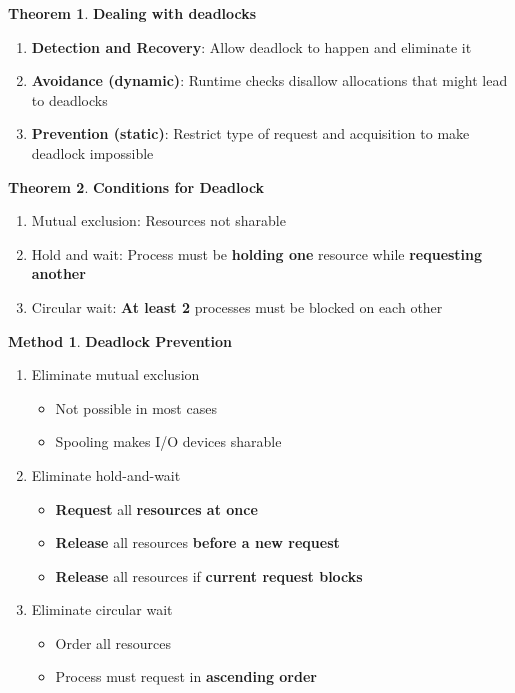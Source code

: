 \documentclass[12pt,a4paper]{article}
\theoremstyle{definition}
\newtheorem{theorem}{Theorem}[section]
\newtheorem{method}{Method}[section]
\newenvironment{myitemize}
{ \begin{itemize}
    \setlength{\itemsep}{5pt}
    \setlength{\parskip}{0pt}
    \setlength{\parsep}{0pt}     }
{ \end{itemize}                  }
\newenvironment{myenumerate}
{ \begin{enumerate}
    \setlength{\itemsep}{5pt}
    \setlength{\parskip}{0pt}
    \setlength{\parsep}{0pt}     }
{ \end{enumerate}                }
\begin{document}
\begin{theorem}{\textbf{Dealing with deadlocks}}
	\begin{myenumerate}
		\item \textbf{Detection and Recovery}: Allow deadlock to happen and eliminate it
		\item \textbf{Avoidance (dynamic)}: Runtime checks disallow allocations that might lead to deadlocks
		\item \textbf{Prevention (static)}: Restrict type of request and acquisition to make deadlock impossible
	\end{myenumerate}
\end{theorem}

\begin{theorem}{\textbf{Conditions for Deadlock}}
	\begin{myenumerate}
		\item Mutual exclusion: Resources not sharable
		\item Hold and wait: Process must be \textbf{holding one} resource while \textbf{requesting another}
		\item Circular wait: \textbf{At least 2} processes must be blocked on each other
	\end{myenumerate}
\end{theorem}

\begin{method}{\textbf{Deadlock Prevention}}
	\begin{myenumerate}
		\item Eliminate mutual exclusion
		\begin{myitemize}
			\item Not possible in most cases
			\item Spooling makes I/O devices sharable
		\end{myitemize}
		\item Eliminate hold-and-wait 
		\begin{myitemize}
			\item \textbf{Request} all \textbf{resources at once}
			\item \textbf{Release} all resources \textbf{before a new request}
			\item \textbf{Release} all resources if \textbf{current request blocks}
		\end{myitemize}
		\item Eliminate circular wait
		\begin{myitemize}
			\item Order all resources
			\item Process must request in \textbf{ascending order}
		\end{myitemize}
	\end{myenumerate}
\end{method}
\end{document}

